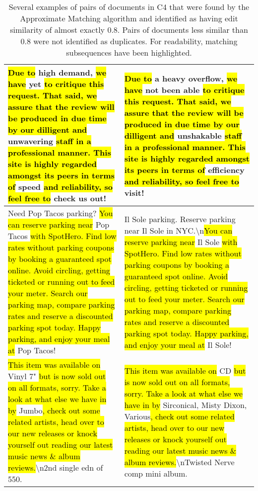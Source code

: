 
\begin{table*}[htbp]
  \caption{Several examples of pairs of documents in C4 that were found by the Approximate Matching algorithm and identified as having edit similarity of almost exactly 0.8. Pairs of documents less similar than 0.8 were not identified as duplicates. For readability, matching subsequences have been highlighted.}
  \label{tab:qualitative_near_boundary}%
  \centering
    \small
    \begin{tabular}{p{.48\linewidth}|p{.48\linewidth}}
    \toprule
    \hl{Due to} high demand, \hl{we have} yet \hl{to critique this request. That said, we assure that the review will be produced in due time by our dilligent and} unwavering \hl{staff in a professional manner. This site is highly regarded amongst its peers in terms of} speed \hl{and reliability, so feel free to} check us out! &
    \hl{Due to} a heavy overflow, \hl{we have} not been able \hl{to critique this request. That said, we assure that the review will be produced in due time by our dilligent and} unshakable \hl{staff in a professional manner. This site is highly regarded amongst its peers in terms of} efficiency \hl{and reliability, so feel free to} visit! \\
    \midrule
    Need Pop Tacos parking? \hl{You can reserve parking near} Pop Tacos \hl{with SpotHero. Find low rates without parking coupons by booking a guaranteed spot online. Avoid circling, getting ticketed or running out to feed your meter. Search our parking map, compare parking rates and reserve a discounted parking spot today. Happy parking, and enjoy your meal at} Pop Tacos! & Il Sole parking. Reserve parking near Il Sole in NYC.\textbackslash{}n\hl{You can reserve parking near} Il Sole \hl{with SpotHero. Find low rates without parking coupons by booking a guaranteed spot online. Avoid circling, getting ticketed or running out to feed your meter. Search our parking map, compare parking rates and reserve a discounted parking spot today. Happy parking, and enjoy your meal at} Il Sole! \\
    \midrule
    \hl{This item was available on} Vinyl 7" \hl{but is now sold out on all formats, sorry. Take a look at what else we have in by} Jumbo\hl{, check out some related artists, head over to our new releases or knock yourself out reading our latest music news \& album reviews.}\textbackslash{}n2nd single edn of 550. &
    \hl{This item was available on} CD \hl{but is now sold out on all formats, sorry. Take a look at what else we have in by} Sirconical, Misty Dixon, Various\hl{, check out some related artists, head over to our new releases or knock yourself out reading our latest music news \& album reviews.}\textbackslash{}nTwisted Nerve comp mini album. \\

\end{tabular}
\end{table*}
